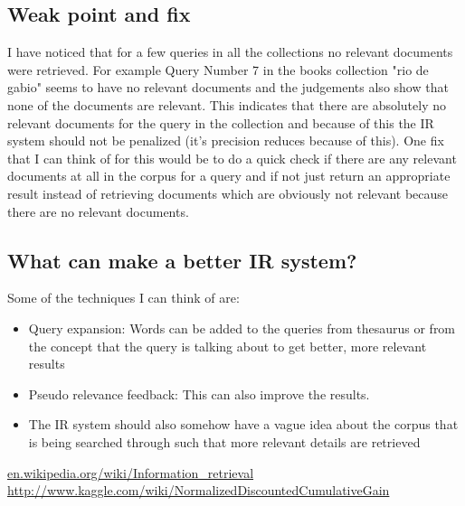 \documentclass[12pt,letterpaper]{article}
\begin{document}
\subsection*{Weak point and fix}
I have noticed that for a few queries in all the collections no relevant documents were retrieved. 
For example Query Number 7 in the books collection "rio de gabio" seems to have no relevant documents and the judgements also show that none of the documents are relevant. This indicates that there are absolutely no relevant documents for the query in the collection and because of this the IR system should not be penalized (it's precision reduces because of this). One fix that I can think of for this would be to do a quick check if there are any relevant documents at all in the corpus for a query and if not just return an appropriate result instead of retrieving documents which are obviously not relevant because there are no relevant documents.

\subsection*{What can make a better IR system?}
Some of the techniques I can think of are:
\begin{itemize}
\item Query expansion: Words can be added to the queries from thesaurus or from the concept that the query is talking about to get better, more relevant results
\item Pseudo relevance feedback: This can also improve the results.
\item The IR system should also somehow have a vague idea about the corpus that is being searched through such that more relevant details are retrieved
\end{itemize}

\begin{thebibliography}{1}
 \url{en.wikipedia.org/wiki/Information_retrieval}
 \url{http://www.kaggle.com/wiki/NormalizedDiscountedCumulativeGain}

\end{thebibliography}
\end{document}
